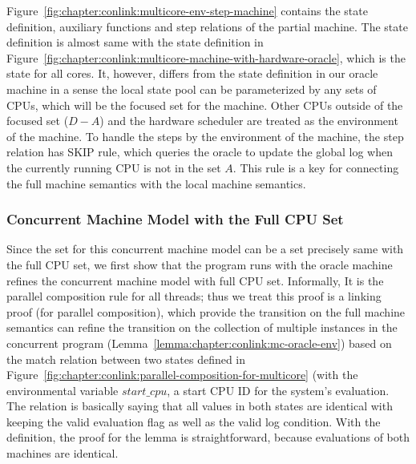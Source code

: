 Figure~\ref{fig:chapter:conlink:multicore-env-step-machine} contains the state definition, 
auxiliary functions and step relations of the partial machine. 
The state definition is almost same with the state definition in Figure~\ref{fig:chapter:conlink:multicore-machine-with-hardware-oracle},
which is the state for all cores.
It, however, differs from the state definition in our oracle machine in a sense the local state pool can be parameterized by any sets of CPUs, which will be the focused set for the machine.
Other CPUs outside of the focused set ($D - A$) and the hardware scheduler are treated as the environment of the machine. 
To handle the steps by the environment of the machine, the step relation has \textsf{SKIP} rule, 
which queries the oracle to update the global log when the currently running CPU is not in the set $A$.
This rule is a key for connecting the full machine semantics with the local machine semantics. 

\subsubsection{Concurrent Machine Model with the Full CPU Set}


Since the set for this concurrent machine model can be a set precisely same with the full CPU set, 
we first show that the program runs with the oracle machine refines the concurrent machine model with full CPU set. 
Informally, It is the parallel composition rule for all threads; thus we treat this proof is a linking proof (for parallel composition), which provide the transition on the full machine semantics can refine the transition on the collection of multiple instances in the concurrent program (Lemma~\ref{lemma:chapter:conlink:mc-oracle-env}) based on the 
match relation between two states defined in Figure~\ref{fig:chapter:conlink:parallel-composition-for-multicore} (with the 
environmental variable $start\_cpu$, a start CPU ID for the system's evaluation. 
The relation is basically saying that all values in both states are identical with keeping the valid evaluation flag as well as the valid log condition. 
With the definition, the proof for the lemma is straightforward, because evaluations of both machines are identical. 


